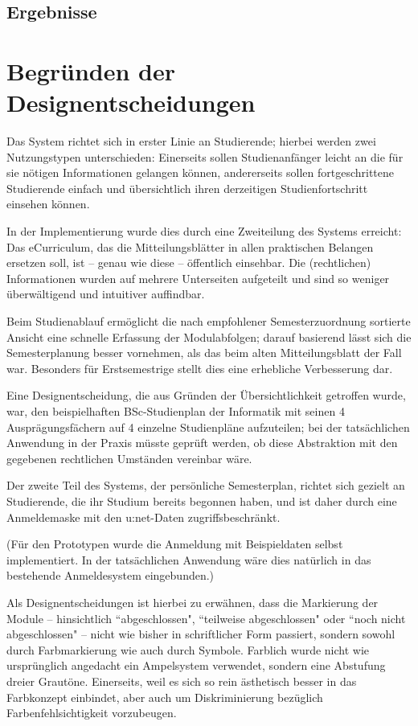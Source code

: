 \documentclass[a4paper,10pt]{scrartcl}
\begin{document}
\subsection*{Ergebnisse}

\section*{Begründen der Designentscheidungen}
Das System richtet sich in erster Linie an Studierende; hierbei werden zwei Nutzungstypen unterschieden: Einerseits sollen Studienanfänger leicht an die für sie nötigen Informationen gelangen können, andererseits sollen fortgeschrittene Studierende einfach und übersichtlich ihren derzeitigen Studienfortschritt einsehen können.

In der Implementierung wurde dies durch eine Zweiteilung des Systems erreicht: Das eCurriculum, das die Mitteilungsblätter in allen praktischen Belangen ersetzen soll, ist – genau wie diese – öffentlich einsehbar. Die (rechtlichen) Informationen wurden auf mehrere Unterseiten aufgeteilt und sind so weniger überwältigend und intuitiver auffindbar.

Beim Studienablauf ermöglicht die nach empfohlener Semesterzuordnung sortierte Ansicht eine schnelle Erfassung der Modulabfolgen; darauf basierend lässt sich die Semesterplanung besser vornehmen, als das beim alten Mitteilungsblatt der Fall war. Besonders für Erstsemestrige stellt dies eine erhebliche Verbesserung dar.

Eine Designentscheidung, die aus Gründen der Übersichtlichkeit getroffen wurde, war, den beispielhaften BSc-Studienplan der Informatik mit seinen 4 Ausprägungsfächern auf 4 einzelne Studienpläne aufzuteilen; bei der tatsächlichen Anwendung in der Praxis müsste geprüft werden, ob diese Abstraktion mit den gegebenen rechtlichen Umständen vereinbar wäre.

Der zweite Teil des Systems, der persönliche Semesterplan, richtet sich gezielt an Studierende, die ihr Studium bereits begonnen haben, und ist daher durch eine Anmeldemaske mit den u:net-Daten zugriffsbeschränkt.

(Für den Prototypen wurde die Anmeldung mit Beispieldaten selbst implementiert. In der tatsächlichen Anwendung wäre dies natürlich in das bestehende Anmeldesystem eingebunden.)

Als Designentscheidungen ist hierbei zu erwähnen, dass die Markierung der Module – hinsichtlich ``abgeschlossen", ``teilweise abgeschlossen" oder ``noch nicht abgeschlossen" – nicht wie bisher in schriftlicher Form passiert, sondern sowohl durch Farbmarkierung wie auch durch Symbole. Farblich wurde nicht wie ursprünglich angedacht ein Ampelsystem verwendet, sondern eine Abstufung dreier Grautöne. Einerseits, weil es sich so rein ästhetisch besser in das Farbkonzept einbindet, aber auch um Diskriminierung bezüglich Farbenfehlsichtigkeit vorzubeugen.
\end{document}
